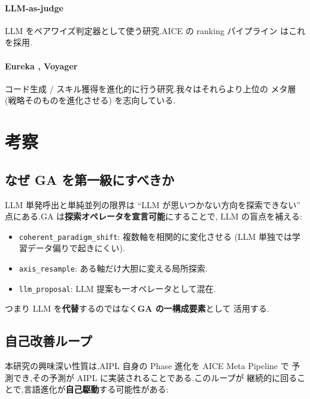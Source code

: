 \documentclass[11pt,a4paper]{article}
\newcommand{\code}[1]{\texttt{\small #1}}
\begin{document}
\paragraph{LLM-as-judge \cite{zheng2023judge}}
LLM をペアワイズ判定器として使う研究.AICE の ranking パイプライン
はこれを採用.

\paragraph{Eureka \cite{ma2023eureka}, Voyager \cite{wang2023voyager}}
コード生成 / スキル獲得を進化的に行う研究.我々はそれらより上位の
メタ層 (戦略そのものを進化させる) を志向している.

\section{考察}
\label{sec:disc}

\subsection{なぜ GA を第一級にすべきか}

LLM 単発呼出と単純並列の限界は ``LLM が思いつかない方向を探索できない''
点にある.GA は\textbf{探索オペレータを宣言可能}にすることで,
LLM の盲点を補える:

\begin{itemize}[leftmargin=*,itemsep=0pt]
  \item \code{coherent\_paradigm\_shift}: 複数軸を相関的に変化させる
    (LLM 単独では学習データ偏りで起きにくい).
  \item \code{axis\_resample}: ある軸だけ大胆に変える局所探索.
  \item \code{llm\_proposal}: LLM 提案も一オペレータとして混在.
\end{itemize}

つまり LLM を\textbf{代替}するのではなく\textbf{GA の一構成要素}として
活用する.

\subsection{自己改善ループ}

本研究の興味深い性質は,AIPL 自身の Phase 進化を AICE Meta Pipeline で
予測でき,その予測が AIPL に実装されることである.このループが
継続的に回ることで,言語進化が\textbf{自己駆動}する可能性がある:

\begin{center}
\end{center}
\end{document}
